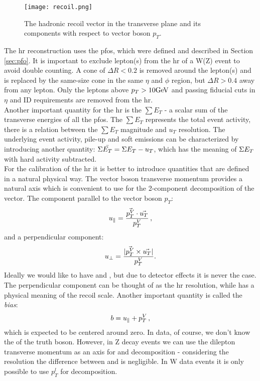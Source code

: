 	\begin{figure}[htpb]
		\texttt{[image: recoil.png]}
		\caption[Hadronic recoil]{The hadronic recoil vector in the transverse plane and its components with respect to vector boson $p_T$.}
		\label{fig::hr}
	\end{figure}
	The \gls{hr} reconstruction uses the \gls{pfos}, which were defined and described in Section \ref{sec:pfo}. It is important to exclude lepton(s) from the \gls{hr} of a W(Z) event to avoid double counting. A cone of $\Delta R <0.2$ is removed around the lepton(s) and is replaced by the same-size cone in the same $\eta$ and $\phi$ region, but $\Delta R >0.4$ away from any lepton. Only the leptons above $p_T>10\text{Ge\kern -0.1em V}$ and passing fiducial cuts in $\eta$ and ID requirements are removed from the \gls{hr}. \\
	Another important quantity for the \gls{hr} is the $\sum E_T$ - a scalar sum of the transverse energies of all the \gls{pfos}. The $\sum E_T$ represents the total event activity, there is a relation between the $\sum E_T$ magnitude and $u_T$ resolution. The underlying event activity, pile-up and soft emissions can be characterized by introducing another quantity: $\Sigma \bar{E_T}  = \Sigma E_T -u_{T}$, which has the meaning of $\Sigma E_T$ with hard activity subtracted.\\
	For the calibration of the \gls{hr} it is better to introduce quantities that are defined in a natural physical way. The vector boson transverse momentum provides a natural axis which is convenient to use for the 2-component decomposition of the \ut vector. The \ut component parallel to the vector boson $p_T$:
	\begin{equation}
	u_{\parallel} =  \frac{\vec{p_{T}^{V}}\cdot\vec{u_{T}}}{p_{T}^{V}}\,,
	\end{equation}
	and a perpendicular component: 
	\begin{equation}
	u_{\perp} = \frac{|\vec{p_{T}^{V}}\times\vec{u_{T}}|}{p_{T}^{V}}.
	\end{equation}
	 Ideally we would like to have  and , but due to detector effects it is never the case. The perpendicular component \uperp can be thought of as the \gls{hr} resolution, while \upar has a physical meaning of the recoil scale. Another important quantity is called the \textit{bias}:
	 \begin{equation}
	 b = u_{\parallel} + p_{T}^{V}\,,
	 \end{equation}
	 which is expected to be centered around zero. In data, of course, we don't know the \ptv of the truth boson. However, in Z decay events we can use the dilepton transverse momentum \ptll as an axis for \uperp and \upar decomposition - considering the \ut resolution the difference between \ptv and \ptll is negligible. In W data events it is only possible to use $p_T^l$ for \ut decomposition.
	 
